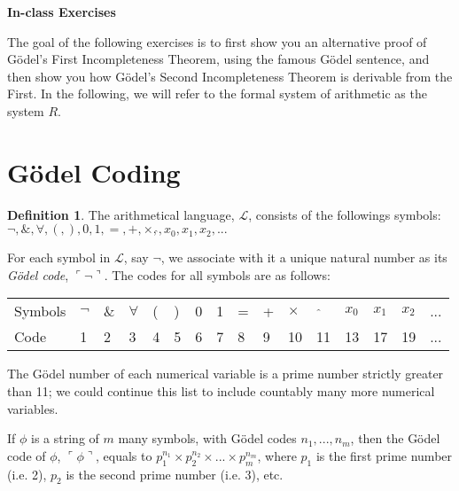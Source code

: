 \documentclass[11pt]{article}
\theoremstyle{definition}
\newtheorem{defn}{Definition}
\begin{document}




\begin{center}
{\LARGE \bf In-class Exercises}
\end{center}

\smallskip


The goal of the following exercises is to first show you an alternative proof of G\"odel's First Incompleteness Theorem, using the famous G\"odel sentence, and then show you how G\"odel's Second Incompleteness Theorem is derivable from the First. In the following, we will refer to the formal system of arithmetic as the system $R$.

\section{G\"odel Coding}

\begin{defn}
The arithmetical language, $\mathscr{L}$, consists of the followings symbols: $\neg, \&, \forall, (, ), 0, 1, =, +, \times, \hat{\text{}}, x_0, x_1, x_2, ...$
\end{defn}

For each symbol in $\mathscr{L}$, say $\neg$, we associate with it a unique natural number as its \textit{G\"odel code}, $\ulcorner \neg \urcorner$. The codes for all symbols are as follows: 
\begin{table}[h]
\begin{tabular}{llllllllllllllll}
Symbols    & $\neg$ & $\&$  & $\forall$  & (  &  )  & 0 & 1 & = & + & $\times$  & $\, \, \hat{\text{}}$  &  $x_0$  &  $x_1$  &  $x_2$  & ...         \\
Code    & 1 & 2 & 3 & 4 & 5 & 6 & 7 & 8 & 9 & 10 & 11 & 13 & 17 & 19 & ...
\end{tabular}
\end{table}

The G\"odel number of each numerical variable is a prime number strictly greater than 11; we could continue this list to include countably many more numerical variables.

If $\phi$ is a string of $m$ many symbols, with G\"odel codes $n_1, ..., n_m$, then the G\"odel code of $\phi$, $\ulcorner \phi \urcorner$, equals to $p_1^{n_1} \times p_2^{n_2} \times ...\times p_m^{n_m}$, where $p_1$ is the first prime number (i.e. 2), $p_2$ is the second prime number (i.e. 3), etc.
\end{document}
